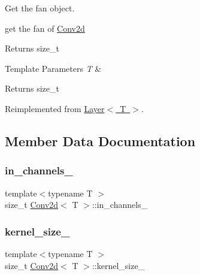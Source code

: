 Get the fan object. 

get the fan of \mbox{\hyperlink{class_conv2d}{Conv2d}}

\begin{DoxyReturn}{Returns}
size\+\_\+t
\end{DoxyReturn}

\begin{DoxyTemplParams}{Template Parameters}
{\em T} & \\
\hline
\end{DoxyTemplParams}
\begin{DoxyReturn}{Returns}
size\+\_\+t 
\end{DoxyReturn}


Reimplemented from \mbox{\hyperlink{class_layer_a43681206a2ef690667c41423b6b6f20b}{Layer$<$ T $>$}}.



\subsection{Member Data Documentation}
\mbox{\label{class_conv2d_afdb638e506f642d24a8d22fb8c2a821a}} 
\subsubsection{\texorpdfstring{in\_channels\_}{in\_channels\_}}
{\footnotesize\ttfamily template$<$typename T $>$ \\
size\+\_\+t \mbox{\hyperlink{class_conv2d}{Conv2d}}$<$ T $>$\+::in\+\_\+channels\+\_\+\hspace{0.3cm}{\ttfamily [protected]}}

\mbox{\label{class_conv2d_ad6447ab4000d593e8c4be9bb9c18f92b}} 
\subsubsection{\texorpdfstring{kernel\_size\_}{kernel\_size\_}}
{\footnotesize\ttfamily template$<$typename T $>$ \\
size\+\_\+t \mbox{\hyperlink{class_conv2d}{Conv2d}}$<$ T $>$\+::kernel\+\_\+size\+\_\+\hspace{0.3cm}{\ttfamily [protected]}}

